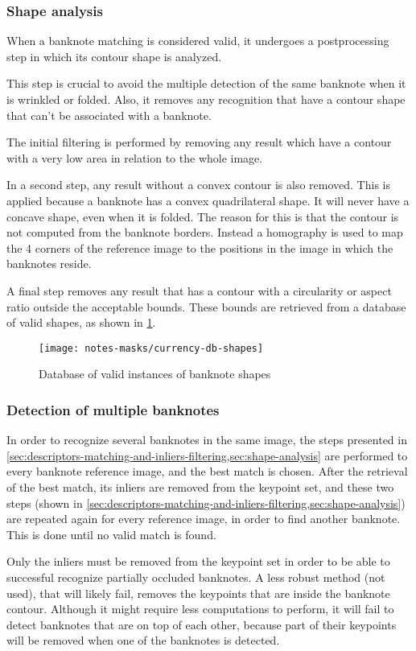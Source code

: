 \subsubsection{Shape analysis}\label{sec:shape-analysis}

When a banknote matching is considered valid, it undergoes a postprocessing step in which its contour shape is analyzed.

This step is crucial to avoid the multiple detection of the same banknote when it is wrinkled or folded. Also, it removes any recognition that have a contour shape that can't be associated with a banknote.

The initial filtering is performed by removing any result which have a contour with a very low area in relation to the whole image.

In a second step, any result without a convex contour is also removed. This is applied because a banknote has a convex quadrilateral shape. It will never have a concave shape, even when it is folded. The reason for this is that the contour is not computed from the banknote borders. Instead a homography is used to map the 4 corners of the reference image to the positions in the image in which the banknotes reside.

A final step removes any result that has a contour with a circularity or aspect ratio outside the acceptable bounds. These bounds are retrieved from a database of valid shapes, as shown in \cref{fig:currency-db-shapes}.

\begin{figure}
	\centering
	\texttt{[image: notes-masks/currency-db-shapes]}
	\caption{Database of valid instances of banknote shapes}
	\label{fig:currency-db-shapes}
\end{figure}


\subsubsection{Detection of multiple banknotes}

In order to recognize several banknotes in the same image, the steps presented in \cref{sec:descriptors-matching-and-inliers-filtering,sec:shape-analysis} are performed to every banknote reference image, and the best match is chosen. After the retrieval of the best match, its inliers are removed from the keypoint set, and these two steps (shown in \cref{sec:descriptors-matching-and-inliers-filtering,sec:shape-analysis}) are repeated again for every reference image, in order to find another banknote. This is done until no valid match is found.

Only the inliers must be removed from the keypoint set in order to be able to successful recognize partially occluded banknotes. A less robust method (not used), that will likely fail, removes the keypoints that are inside the banknote contour. Although it might require less computations to perform, it will fail to detect banknotes that are on top of each other, because part of their keypoints will be removed when one of the banknotes is detected.
